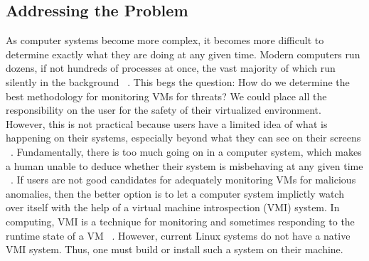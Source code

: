 \documentclass{report}
\begin{document}
\begin{spacing}{1.5}
\section{Addressing the Problem}
{\large
\noindent As computer systems become more complex, it becomes more difficult to determine exactly what they are doing at any given time. Modern computers run dozens, if not hundreds of processes at once, the vast majority of which run silently in the background ~\cite{findlay2021practical}. This begs the question: How do we determine the best methodology for monitoring VMs for threats? We could place all the responsibility on the user for the safety of their virtualized environment. However, this is not practical because users have a limited idea of what is happening on their systems, especially beyond what they can see on their screens ~\cite{findlay2021practical}. Fundamentally, there is too much going on in a computer system, which makes a human unable to deduce whether their system is misbehaving at any given time ~\cite{findlay2021practical}. If users are not good candidates for adequately monitoring VMs for malicious anomalies, then the better option is to let a computer system implictly watch over itself with the help of a virtual machine introspection (VMI) system. In computing, VMI is a technique for monitoring and sometimes responding to the runtime state of a VM ~\cite{Payne2011}. However, current Linux systems do not have a native VMI system. Thus, one must build or install such a system on their machine.
\newline
}


\end{spacing}
\end{document}
